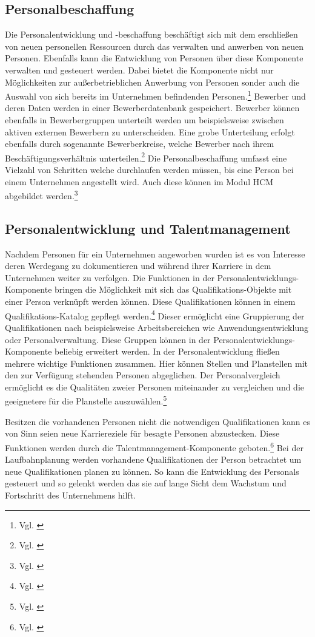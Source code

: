 \subsection{Personalbeschaffung}
Die Personalentwicklung und -beschaffung beschäftigt sich mit dem erschließen von neuen personellen Ressourcen durch das verwalten und anwerben von neuen Personen. Ebenfalls kann die Entwicklung von Personen über diese Komponente verwalten und gesteuert werden. Dabei bietet die Komponente nicht nur Möglichkeiten zur außerbetrieblichen Anwerbung von Personen sonder auch die Auswahl von sich bereits im Unternehmen befindenden Personen.\footnote{Vgl. \cite{SSSUM2019a}} Bewerber und deren Daten werden in einer Bewerberdatenbank gespeichert. Bewerber können ebenfalls in Bewerbergruppen unterteilt werden um beispielsweise zwischen aktiven externen Bewerbern zu unterscheiden. Eine grobe Unterteilung erfolgt ebenfalls durch sogenannte Bewerberkreise, welche Bewerber nach ihrem Beschäftigungsverhältnis unterteilen.\footnote{Vgl. \cite{SSSUM2019}} Die Personalbeschaffung umfasst eine Vielzahl von Schritten welche durchlaufen werden müssen, bis eine Person bei einem Unternehmen angestellt  wird. Auch diese können im Modul HCM abgebildet werden.\footnote{Vgl. \cite{SSSUM2019a}}

\subsection{Personalentwicklung und Talentmanagement}
Nachdem Personen für ein Unternehmen angeworben wurden ist es von Interesse deren Werdegang zu dokumentieren und während ihrer Karriere in dem Unternehmen weiter zu verfolgen. Die Funktionen in der Personalentwicklungs-Komponente bringen die Möglichkeit mit sich das Qualifikations-Objekte mit einer Person verknüpft werden können. Diese Qualifikationen können in einem Qualifikations-Katalog gepflegt werden.\footnote{Vgl. \cite{SSSUM2019a}} Dieser ermöglicht eine Gruppierung der Qualifikationen nach beispielsweise Arbeitsbereichen wie Anwendungsentwicklung oder Personalverwaltung. Diese Gruppen können in der Personalentwicklungs-Komponente beliebig erweitert werden. In der Personalentwicklung fließen mehrere wichtige Funktionen zusammen. Hier können Stellen und Planstellen mit den zur Verfügung stehenden Personen abgeglichen. Der Personalvergleich ermöglicht es die Qualitäten zweier Personen miteinander zu vergleichen und die geeignetere für die Planstelle auszuwählen.\footnote{Vgl. \cite{SSSUM2019a}} 

Besitzen die vorhandenen Personen nicht die notwendigen Qualifikationen kann es von Sinn seien neue Karriereziele für besagte Personen abzustecken. Diese Funktionen werden durch die Talentmanagement-Komponente geboten.\footnote{Vgl. \cite{SSSUM2019}} Bei der Laufbahnplanung werden vorhandene Qualifikationen der Person betrachtet um neue Qualifikationen planen zu können. So kann die Entwicklung des Personals gesteuert und so gelenkt werden das sie auf lange Sicht dem Wachstum und Fortschritt des Unternehmens hilft. 

